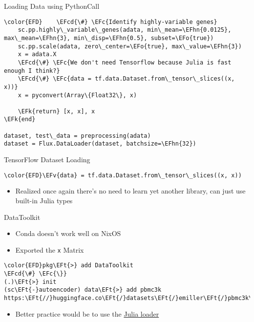 \documentclass[bigger]{beamer}
\newcommand{\EFc}[1]{\textcolor{EFc}{#1}} %
\newcommand{\EFcd}[1]{\textcolor{EFcd}{#1}} %
\newcommand{\EFk}[1]{\textcolor{EFk}{#1}} %
\newcommand{\EFv}[1]{\textcolor{EFv}{#1}} %
\newcommand{\EFt}[1]{\textcolor{EFt}{#1}} %
\newcommand{\EFo}[1]{\textcolor{EFo}{#1}} %
\newcommand{\EFhn}[1]{\textcolor{EFhn}{\textbf{#1}}} %
\begin{document}
\begin{frame}[label={sec:org5eb81c7},fragile]{Loading Data using PythonCall}
 \begin{Code}
\begin{Verbatim}
\color{EFD}    \EFcd{\#} \EFc{Identify highly-variable genes}
    sc.pp.highly\_variable\_genes(adata, min\_mean=\EFhn{0.0125}, max\_mean=\EFhn{3}, min\_disp=\EFhn{0.5}, subset=\EFo{true})
    sc.pp.scale(adata, zero\_center=\EFo{true}, max\_value=\EFhn{3})
    x = adata.X
    \EFcd{\#} \EFc{We don't need Tensorflow because Julia is fast enough I think?}
    \EFcd{\#} \EFc{data = tf.data.Dataset.from\_tensor\_slices((x, x))}
    x = pyconvert(Array\{Float32\}, x)

    \EFk{return} [x, x], x
\EFk{end}

dataset, test\_data = preprocessing(adata)
dataset = Flux.DataLoader(dataset, batchsize=\EFhn{32})
\end{Verbatim}
\end{Code}
\end{frame}


\begin{frame}[label={sec:org9b15503},fragile]{TensorFlow Dataset Loading}
 \begin{Code}
\begin{Verbatim}
\color{EFD}\EFv{data} = tf.data.Dataset.from\_tensor\_slices((x, x))
\end{Verbatim}
\end{Code}

\begin{itemize}
\item Realized once again there's no need to learn yet another library, can just use
built-in Julia types
\end{itemize}
\end{frame}

\begin{frame}[label={sec:org971af20},fragile]{DataToolkit}
 \begin{itemize}
\item Conda doesn't work well on NixOS
\item Exported the \texttt{x} Matrix
\end{itemize}
\begin{Code}
\begin{Verbatim}
\color{EFD}pkg\EFt{>} add DataToolkit
\EFcd{\#} \EFc{\}}
(.)\EFt{>} init
(sc\EFt{-}autoencoder) data\EFt{>} add pbmc3k https:\EFt{//}huggingface.co\EFt{/}datasets\EFt{/}emiller\EFt{/}pbmc3k\EFt{/}resolve\EFt{/}main\EFt{/}delim\_file.txt
\end{Verbatim}
\end{Code}

\pause

\begin{itemize}
\item Better practice would be to use the \href{https://tecosaur.github.io/DataToolkitDocs/common/stable/loaders/julia/}{Julia loader}
\end{itemize}
\end{frame}
\end{document}
